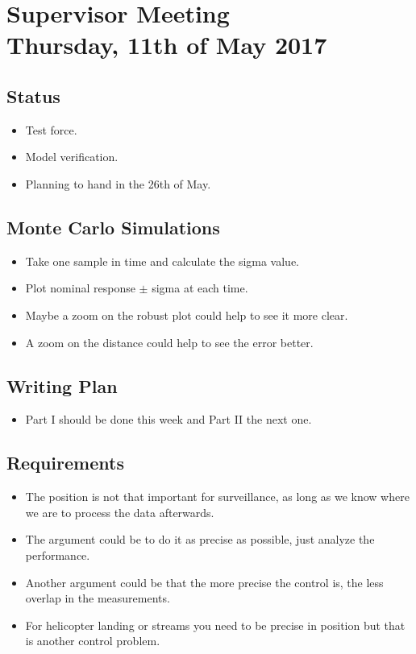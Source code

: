 
\renewcommand{\vec}[1]{\boldsymbol{\mathbf{#1}}}


\section*{Supervisor Meeting\\ \small Thursday, 11th of May 2017}

\subsection{Status}
\begin{itemize}
    \item Test force.
    \item Model verification.
    \item Planning to hand in the 26th of May.
\end{itemize}
\subsection{Monte Carlo Simulations}
\begin{itemize}
	\item Take one sample in time and calculate the sigma value.
    \item Plot nominal response $\pm$ sigma at each time.
    \item Maybe a zoom on the robust plot could help to see it more clear.
    \item A zoom on the distance could help to see the error better.
\end{itemize} 
\subsection{Writing Plan}
\begin{itemize}
    \item Part I should be done this week and Part II the next one.
\end{itemize}
\subsection{Requirements}
\begin{itemize}
    \item The position is not that important for surveillance, as long as we know where we are to process the data afterwards.
    \item The argument could be to do it as precise as possible, just analyze the performance.
    \item Another argument could be that the more precise the control is, the less overlap in the measurements.
    \item For helicopter landing or streams you need to be precise in position but that is another control problem.
\end{itemize}
